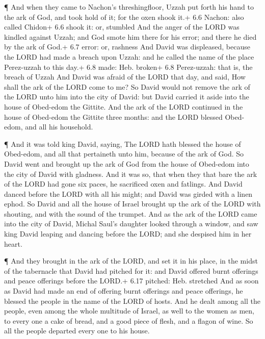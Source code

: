  ¶ And when they came to Nachon's threshingfloor, Uzzah put
forth his hand to the ark of God, and took hold of it; for the oxen
shook it.+ 6.6 Nachon: also called Chidon+ 6.6 shook it: or, stumbled
 And the anger of the LORD was kindled against Uzzah; and
God smote him there for his error; and there he died by the ark of God.+
6.7 error: or, rashness  And David was displeased, because
the LORD had made a breach upon Uzzah: and he called the name of the
place Perez-uzzah to this day.+ 6.8 made: Heb. broken+ 6.8 Perez-uzzah:
that is, the breach of Uzzah  And David was afraid of the
LORD that day, and said, How shall the ark of the LORD come to me?
 So David would not remove the ark of the LORD unto him
into the city of David: but David carried it aside into the house of
Obed-edom the Gittite.  And the ark of the LORD continued
in the house of Obed-edom the Gittite three months: and the LORD blessed
Obed-edom, and all his household.

 ¶ And it was told king David, saying, The LORD hath
blessed the house of Obed-edom, and all that pertaineth unto him,
because of the ark of God. So David went and brought up the ark of God
from the house of Obed-edom into the city of David with gladness.
 And it was so, that when they that bare the ark of the
LORD had gone six paces, he sacrificed oxen and fatlings. 
And David danced before the LORD with all his might; and David was
girded with a linen ephod.  So David and all the house of
Israel brought up the ark of the LORD with shouting, and with the sound
of the trumpet.  And as the ark of the LORD came into the
city of David, Michal Saul's daughter looked through a window, and saw
king David leaping and dancing before the LORD; and she despised him in
her heart.

 ¶ And they brought in the ark of the LORD, and set it in
his place, in the midst of the tabernacle that David had pitched for it:
and David offered burnt offerings and peace offerings before the LORD.+
6.17 pitched: Heb. stretched  And as soon as David had made
an end of offering burnt offerings and peace offerings, he blessed the
people in the name of the LORD of hosts.  And he dealt
among all the people, even among the whole multitude of Israel, as well
to the women as men, to every one a cake of bread, and a good piece of
flesh, and a flagon of wine. So all the people departed every one to his
house.

